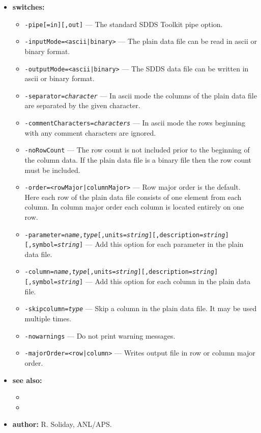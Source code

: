 \begin{itemize}
\item {\bf switches:}
    \begin{itemize}
    \item {\tt -pipe[=in][,out]} --- The standard SDDS Toolkit pipe option.
    \item {\tt -inputMode=<ascii|binary>} --- The plain data file can be read in ascii or binary format.
    \item {\tt -outputMode=<ascii|binary>} --- The SDDS data file can be written in ascii or binary format.
    \item {\tt -separator={\em character}} --- In ascii mode the columns of the plain data file are separated 
	by the given character.
    \item {\tt -commentCharacters={\em characters}} --- In ascii mode the rows beginning with any comment characters are ignored.
    \item {\tt -noRowCount} --- The row count is not included prior to the beginning of the column data. 
	If the plain data file is a binary file then the row count must be included.
    \item {\tt -order=<rowMajor|columnMajor>} --- Row major order is the default. Here each row of the 
	plain data file consists of one element from each column. In column major order each column 
	is located entirely on one row.
    \item {\tt -parameter={\em name},{\em type}[,units={\em string}][,description={\em string}][,symbol={\em string}]} --- 
	Add this option for each parameter in the plain data file.
    \item {\tt -column={\em name},{\em type}[,units={\em string}][,description={\em string}][,symbol={\em string}]} --- 
	Add this option for each column in the plain data file.
    \item {\tt -skipcolumn={\em type}} --- Skip a column in the plain data file. It may be used multiple times.
    \item {\tt -nowarnings} --- Do not print warning messages.
    \item {\tt -majorOrder=<row|column>} --- Writes output file in row or column major order.
    \end{itemize}
\item {\bf see also:}
    \begin{itemize}
    \item {}
    \item {}
    \end{itemize}
\item {\bf author:} R. Soliday, ANL/APS.
\end{itemize}

